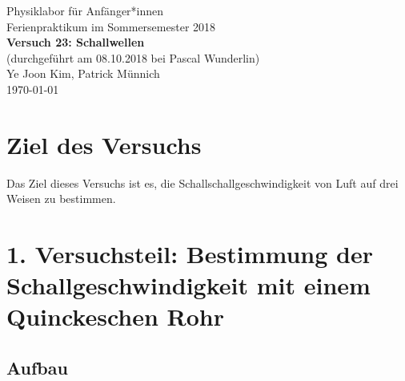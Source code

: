 \documentclass[11pt,a4paper]{article}
\begin{document}
{
\centering 
\large 
Physiklabor für Anf\"anger*innen \\
Ferienpraktikum im Sommersemester 2018 \\[4mm]
\textbf{\LARGE 
Versuch 23: Schallwellen
} \\[3mm]
(durchgef\"uhrt am 08.10.2018 bei Pascal Wunderlin) \\
Ye Joon Kim, Patrick M\"unnich\\
\today \\[10mm]
}

\vspace{50pt}
\tableofcontents
\vspace{22pt}
\listoftables
\vspace{22pt}
\listoffigures
\pagebreak

\section{Ziel des Versuchs}
Das Ziel dieses Versuchs ist es, die Schallschallgeschwindigkeit von Luft auf drei Weisen zu bestimmen. 

\section{1. Versuchsteil: Bestimmung der Schallgeschwindigkeit mit einem Quinckeschen Rohr}


\subsection{Aufbau}
\end{document}
